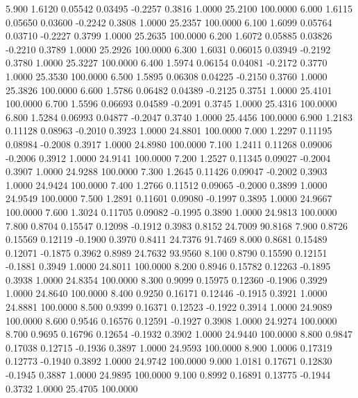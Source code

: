    5.900   1.6120   0.05542   0.03495  -0.2257   0.3816   1.0000  25.2100 100.0000
   6.000   1.6115   0.05650   0.03600  -0.2242   0.3808   1.0000  25.2357 100.0000
   6.100   1.6099   0.05764   0.03710  -0.2227   0.3799   1.0000  25.2635 100.0000
   6.200   1.6072   0.05885   0.03826  -0.2210   0.3789   1.0000  25.2926 100.0000
   6.300   1.6031   0.06015   0.03949  -0.2192   0.3780   1.0000  25.3227 100.0000
   6.400   1.5974   0.06154   0.04081  -0.2172   0.3770   1.0000  25.3530 100.0000
   6.500   1.5895   0.06308   0.04225  -0.2150   0.3760   1.0000  25.3826 100.0000
   6.600   1.5786   0.06482   0.04389  -0.2125   0.3751   1.0000  25.4101 100.0000
   6.700   1.5596   0.06693   0.04589  -0.2091   0.3745   1.0000  25.4316 100.0000
   6.800   1.5284   0.06993   0.04877  -0.2047   0.3740   1.0000  25.4456 100.0000
   6.900   1.2183   0.11128   0.08963  -0.2010   0.3923   1.0000  24.8801 100.0000
   7.000   1.2297   0.11195   0.08984  -0.2008   0.3917   1.0000  24.8980 100.0000
   7.100   1.2411   0.11268   0.09006  -0.2006   0.3912   1.0000  24.9141 100.0000
   7.200   1.2527   0.11345   0.09027  -0.2004   0.3907   1.0000  24.9288 100.0000
   7.300   1.2645   0.11426   0.09047  -0.2002   0.3903   1.0000  24.9424 100.0000
   7.400   1.2766   0.11512   0.09065  -0.2000   0.3899   1.0000  24.9549 100.0000
   7.500   1.2891   0.11601   0.09080  -0.1997   0.3895   1.0000  24.9667 100.0000
   7.600   1.3024   0.11705   0.09082  -0.1995   0.3890   1.0000  24.9813 100.0000
   7.800   0.8704   0.15547   0.12098  -0.1912   0.3983   0.8152  24.7009  90.8168
   7.900   0.8726   0.15569   0.12119  -0.1900   0.3970   0.8411  24.7376  91.7469
   8.000   0.8681   0.15489   0.12071  -0.1875   0.3962   0.8989  24.7632  93.9560
   8.100   0.8790   0.15590   0.12151  -0.1881   0.3949   1.0000  24.8011 100.0000
   8.200   0.8946   0.15782   0.12263  -0.1895   0.3938   1.0000  24.8354 100.0000
   8.300   0.9099   0.15975   0.12360  -0.1906   0.3929   1.0000  24.8640 100.0000
   8.400   0.9250   0.16171   0.12446  -0.1915   0.3921   1.0000  24.8881 100.0000
   8.500   0.9399   0.16371   0.12523  -0.1922   0.3914   1.0000  24.9089 100.0000
   8.600   0.9546   0.16576   0.12591  -0.1927   0.3908   1.0000  24.9274 100.0000
   8.700   0.9695   0.16796   0.12654  -0.1932   0.3902   1.0000  24.9440 100.0000
   8.800   0.9847   0.17038   0.12715  -0.1936   0.3897   1.0000  24.9593 100.0000
   8.900   1.0006   0.17319   0.12773  -0.1940   0.3892   1.0000  24.9742 100.0000
   9.000   1.0181   0.17671   0.12830  -0.1945   0.3887   1.0000  24.9895 100.0000
   9.100   0.8992   0.16891   0.13775  -0.1944   0.3732   1.0000  25.4705 100.0000
